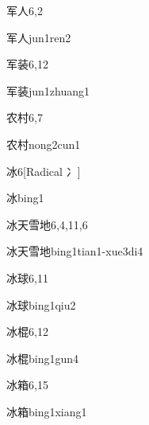 \begin{entry}{军人}{6,2}
  \begin{phonetics}{军人}{jun1ren2}
  \end{phonetics}
\end{entry}

\begin{entry}{军装}{6,12}
  \begin{phonetics}{军装}{jun1zhuang1}
  \end{phonetics}
\end{entry}

\begin{entry}{农村}{6,7}
  \begin{phonetics}{农村}{nong2cun1}
  \end{phonetics}
\end{entry}

\begin{entry}{冰}{6}[Radical 冫]
  \begin{phonetics}{冰}{bing1}
  \end{phonetics}
\end{entry}

\begin{entry}{冰天雪地}{6,4,11,6}
  \begin{phonetics}{冰天雪地}{bing1tian1-xue3di4}
  \end{phonetics}
\end{entry}

\begin{entry}{冰球}{6,11}
  \begin{phonetics}{冰球}{bing1qiu2}
  \end{phonetics}
\end{entry}

\begin{entry}{冰棍}{6,12}
  \begin{phonetics}{冰棍}{bing1gun4}
  \end{phonetics}
\end{entry}

\begin{entry}{冰箱}{6,15}
  \begin{phonetics}{冰箱}{bing1xiang1}
  \end{phonetics}
\end{entry}

